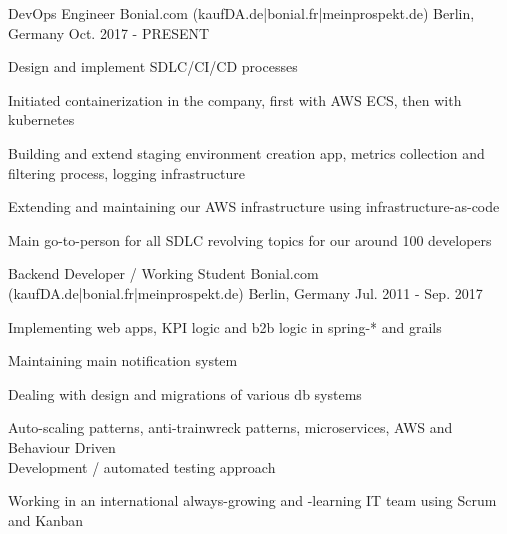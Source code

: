 


\begin{cventries}



\cventry
{DevOps Engineer} %
{Bonial.com (kaufDA.de|bonial.fr|meinprospekt.de)} %
{Berlin, Germany} %
{Oct. 2017 - PRESENT} %
{ %
\begin{cvitems}
\item {Design and implement SDLC/CI/CD processes}
\item {Initiated containerization in the company, first with AWS ECS, then with kubernetes}
\item {Building and extend staging environment creation app, metrics collection and filtering process, logging infrastructure}
\item {Extending and maintaining our AWS infrastructure using infrastructure-as-code }
\item {Main go-to-person for all SDLC revolving topics for our around 100 developers}
\end{cvitems}
}


\cventry
{Backend Developer / Working Student} %
{Bonial.com (kaufDA.de|bonial.fr|meinprospekt.de)} %
{Berlin, Germany} %
{Jul. 2011 - Sep. 2017} %
{ %
\begin{cvitems}
\item {Implementing web apps, KPI logic and b2b logic in spring-* and grails}
\item {Maintaining main notification system}
\item {Dealing with design and migrations of various db systems}
\item {Auto-scaling patterns, anti-trainwreck patterns, microservices, AWS and Behaviour Driven \\ Development / automated testing approach}
\item {Working in an international always-growing and -learning IT team using Scrum and Kanban}
\end{cvitems}
}


\end{cventries}
